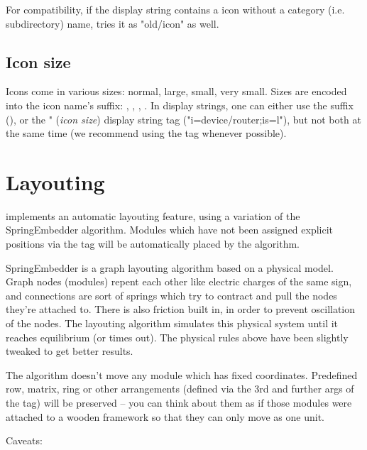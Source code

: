 For compatibility, if the display string contains a icon without
a category (i.e. subdirectory) name, {\opp} tries it as "old/icon" as well.


\subsection{Icon size}

Icons come in various sizes: normal, large, small, very small. Sizes are
encoded into the icon name's suffix: , , , .
In display strings, one can either use the suffix (),
or the " (\textit{icon size}) display string tag ("i=device/router;is=l"),
but not both at the same time (we recommend using the  tag whenever possible).


\section{Layouting}
\label{sec:ch-graphics:layouting}

{\opp} implements an automatic layouting feature, using
a variation of the SpringEmbedder algorithm. Modules which have
not been assigned explicit positions via the  tag will be
automatically placed by the algorithm.

SpringEmbedder is a graph layouting algorithm based on a physical model.
Graph nodes (modules) repent each other like electric charges
of the same sign, and connections are sort of springs which try
to contract and pull the nodes they're attached to. There is also friction
built in, in order to prevent oscillation of the nodes. The layouting algorithm
simulates this physical system until it reaches equilibrium
(or times out). The physical rules above have been slightly tweaked
to get better results.

The algorithm doesn't move any module which has fixed coordinates.
Predefined row, matrix, ring or other arrangements (defined
via the 3rd and further args of the  tag) will be preserved --
you can think about them as if those modules were attached
to a wooden framework so that they can only move as one unit.

Caveats:

